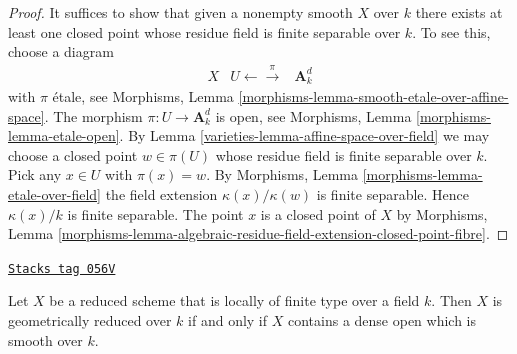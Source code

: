 \begin{proof}

It suffices to show that given a nonempty smooth $X$ over $k$
there exists at least one closed point whose residue field is
finite separable over $k$. To see this, choose a diagram
$$
\begin{array}{ccc}X & U \longleftarrow\overset{\pi}{\longrightarrow} & \mathbf{A}^d_k\end{array}
$$
with $\pi$ \'etale, see
Morphisms, Lemma \ref{morphisms-lemma-smooth-etale-over-affine-space}.
The morphism $\pi : U \to \mathbf{A}^d_k$ is open, see
Morphisms, Lemma \ref{morphisms-lemma-etale-open}.
By
Lemma \ref{varieties-lemma-affine-space-over-field}
we may choose a closed point $w \in \pi(U)$ whose residue field is
finite separable over $k$. Pick any $x \in U$ with $\pi(x) = w$. By
Morphisms, Lemma \ref{morphisms-lemma-etale-over-field}
the field extension $\kappa(x)/\kappa(w)$ is finite separable.
Hence $\kappa(x)/k$ is finite separable. The point $x$ is a
closed point of $X$ by
Morphisms, Lemma
\ref{morphisms-lemma-algebraic-residue-field-extension-closed-point-fibre}.
\end{proof}

\begin{lemma}
\label{varieties-lemma-geometrically-reduced-dense-smooth-open}
\href{https://stacks.math.columbia.edu/tag/056V}{\texttt{Stacks tag 056V}}

Let $X$ be a reduced scheme that is locally of finite type over a field $k$.
Then $X$ is geometrically reduced over $k$ if and only if
$X$ contains a dense open which is smooth over $k$.
\end{lemma}


